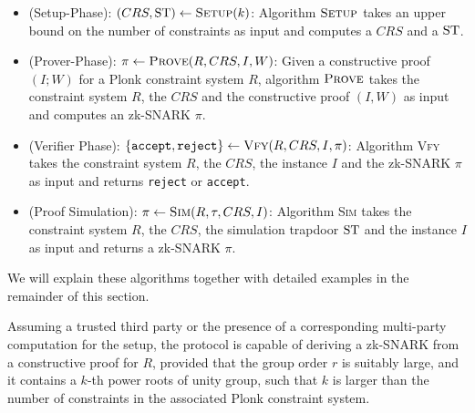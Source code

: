 \begin{itemize}
\item (Setup-Phase): $(CRS,\mathrm{ST})\leftarrow \textsc{Setup}(k)$: Algorithm $\textsc{Setup}$ takes an upper bound on the number of constraints as input and computes a  $CRS$ and a  $\mathrm{ST}$.
\item (Prover-Phase): $\pi\leftarrow \textsc{Prove}(R,CRS,I,W)$: Given a constructive proof $(I;W)$ for a Plonk constraint system $R$, algorithm $\textsc{Prove}$ takes the constraint system $R$, the  $CRS$ and the constructive proof $(I,W)$ as input and computes an zk-SNARK $\pi$.
\item (Verifier Phase): $\{\mathtt{accept},\mathtt{reject}\}\leftarrow \textsc{Vfy}(R,CRS,I,\pi)$:   Algorithm \textsc{Vfy} takes the constraint system $R$, the  $CRS$, the instance $I$ and the zk-SNARK $\pi$ as input and returns \texttt{reject} or \texttt{accept}.
\item (Proof Simulation): $\pi\leftarrow \textsc{Sim}(R,\tau,CRS, I)$: Algorithm \textsc{Sim} takes the constraint system $R$, the  $CRS$, the simulation trapdoor $\mathrm{ST}$ and the instance $I$ as input and returns a zk-SNARK $\pi$. 
\end{itemize}
We will explain these algorithms together with detailed examples in the remainder of this section.

Assuming a trusted third party or the presence of a corresponding multi-party computation for the setup, the protocol is capable of deriving a zk-SNARK from a constructive proof for $R$, provided that the group order $r$ is suitably large, and it contains a $k$-th power roots of unity group, such that $k$ is larger than the number of constraints in the associated Plonk constraint system.

